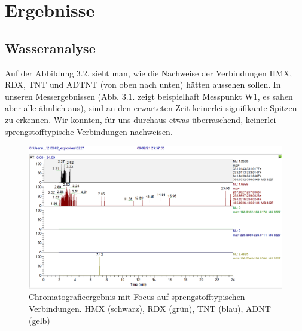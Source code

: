  

\chapter{Ergebnisse}
\section{Wasseranalyse}
Auf der Abbildung 3.2. sieht man, wie die Nachweise der Verbindungen HMX, RDX, TNT und ADTNT (von oben nach unten) hätten aussehen sollen. In unseren Messergebnissen (Abb. 3.1. zeigt beispielhaft Messpunkt W1, es sahen aber alle ähnlich aus), sind an den erwarteten Zeit keinerlei signifikante Spitzen zu erkennen. Wir konnten, für uns durchaus etwas überraschend, keinerlei sprengstofftypische Verbindungen nachweisen.

\begin{figure}[htb!]
\includegraphics[height=\textheight,%
                   width=\textwidth,%
                   keepaspectratio]{Bilder/Explosives_3227_SampleW1.PNG}
\caption{Chromatografieergebnis mit Focus auf sprengstofftypischen Verbindungen. HMX (schwarz), RDX (grün), TNT (blau), ADNT (gelb)}
\end{figure}

